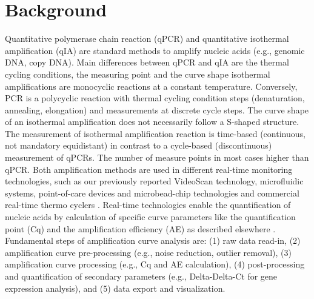 \documentclass[twocolumn]{bmcart}%
\begin{document}

\section*{Background}

Quantitative polymerase chain reaction (qPCR) and quantitative isothermal 
amplification (qIA) are standard methods to amplify nucleic acids (e.g., genomic 
DNA, copy DNA). Main differences between qPCR and qIA are the thermal cycling 
conditions, the measuring point and the curve shape isothermal amplifications 
are monocyclic reactions at a constant temperature. Conversely, PCR is a 
polycyclic reaction with thermal cycling condition steps (denaturation, 
annealing, elongation) and measurements at discrete cycle steps. The curve shape 
of an isothermal amplification does not necessarily follow a S-shaped structure. 
The measurement of isothermal amplification reaction is time-based (continuous, 
not mandatory equidistant) in contrast to a cycle-based (discontinuous) 
measurement of qPCRs. The number of measure points in most cases higher than 
qPCR. Both amplification methods are used in different real-time monitoring 
technologies, such as our previously reported VideoScan technology, microfluidic 
systems, point-of-care devices and microbead-chip technologies and commercial 
real-time thermo cyclers \cite{chang_2012, roediger_highly_2013, 
roediger_bead_qPCR_2013, rodiger_nucleic_2014}. Real-time technologies enable 
the quantification of nucleic acids by calculation of specific curve parameters 
like the quantification point (Cq) and the amplification efficiency (AE) as 
described elsewhere \cite{ruijter_2013,tellinghuisen_2014}. Fundamental steps of 
amplification curve analysis are: (1) raw data read-in, (2) amplification curve 
pre-processing (e.g., noise reduction, outlier removal), (3) amplification curve 
processing (e.g., Cq and AE calculation), (4) post-processing and quantification 
of secondary parameters (e.g., Delta-Delta-Ct for gene expression analysis), 
and (5) data export and visualization.
\end{document}

